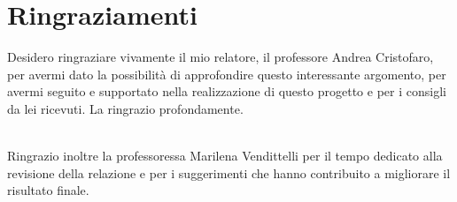 \documentclass[main]{subfiles}
\begin{document}
\section*{Ringraziamenti}
Desidero ringraziare vivamente il mio relatore, il professore Andrea Cristofaro, per avermi dato la possibilità di
approfondire questo interessante argomento, per avermi seguito e supportato nella realizzazione di questo progetto e
per i consigli da lei ricevuti. La ringrazio profondamente.

\noindent\\
Ringrazio inoltre la professoressa Marilena Vendittelli per il tempo dedicato alla revisione della relazione e per 
i suggerimenti che hanno contribuito a migliorare il risultato finale.
\end{document}
